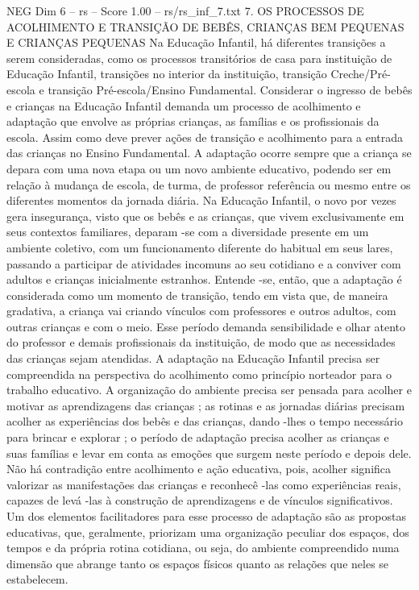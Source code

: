 \begin{textsample}{NEG Dim 6 – rs – Score 1.00 – rs/rs\_inf\_7.txt}  \label{ex:f6_neg_105}
7.
OS PROCESSOS DE ACOLHIMENTO E TRANSIÇÃO DE BEBÊS, CRIANÇAS BEM PEQUENAS E CRIANÇAS PEQUENAS Na Educação Infantil, há diferentes transições a serem consideradas, como os processos transitórios de casa para instituição de Educação Infantil, transições no interior da instituição, transição Creche/Pré-escola e transição Pré-escola/Ensino Fundamental.
Considerar o ingresso de bebês e crianças na Educação Infantil demanda um processo de acolhimento e adaptação que envolve as próprias crianças, as famílias e os profissionais da escola.
Assim como deve prever ações de transição e acolhimento para a entrada das crianças no Ensino Fundamental.
A adaptação ocorre sempre que a criança se depara com uma nova etapa ou um novo ambiente educativo, podendo ser em relação à mudança de escola, de turma, de professor referência ou mesmo entre os diferentes momentos da jornada diária.
Na Educação Infantil, o novo por vezes gera insegurança, visto que os bebês e as crianças, que vivem exclusivamente em seus contextos familiares, deparam -se com a diversidade presente em um ambiente coletivo, com um funcionamento diferente do habitual em seus lares, passando a participar de atividades incomuns ao seu cotidiano e a conviver com adultos e crianças inicialmente estranhos.
Entende -se, então, que a adaptação é considerada como um momento de transição, tendo em vista que, de maneira gradativa, a criança vai criando vínculos com professores e outros adultos, com outras crianças e com o meio.
Esse período demanda sensibilidade e olhar atento do professor e demais profissionais da instituição, de modo que as necessidades das crianças sejam atendidas.
A adaptação na Educação Infantil precisa ser compreendida na perspectiva do acolhimento como princípio norteador para o trabalho educativo.
A organização do ambiente precisa ser pensada para acolher e motivar as aprendizagens das crianças ; as rotinas e as jornadas diárias precisam acolher as experiências dos bebês e das crianças, dando -lhes o tempo necessário para brincar e explorar ; o período de adaptação precisa acolher as crianças e suas famílias e levar em conta as emoções que surgem neste período e depois dele.
Não há contradição entre acolhimento e ação educativa, pois, acolher significa valorizar as manifestações das crianças e reconhecê -las como experiências reais, capazes de levá -las à construção de aprendizagens e de vínculos significativos.
Um dos elementos facilitadores para esse processo de adaptação são as propostas educativas, que, geralmente, priorizam uma organização peculiar dos espaços, dos tempos e da própria rotina cotidiana, ou seja, do ambiente compreendido numa dimensão que abrange tanto os espaços físicos quanto as relações que neles se estabelecem.

\end{textsample}
